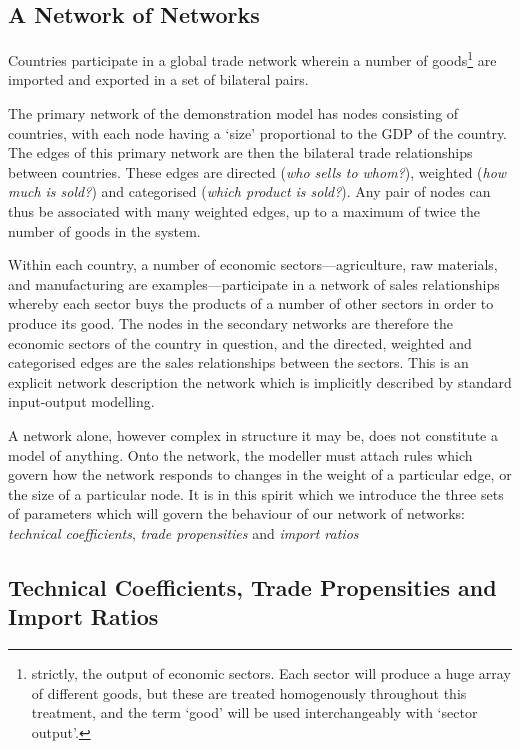 \documentclass[preprint,authoryear,3p]{elsarticle}
\begin{document}
\subsection{A Network of Networks}
Countries participate in a global trade network wherein a number of goods\footnote{strictly, the output of economic sectors. Each sector will produce a huge array of different goods, but these are treated homogenously throughout this treatment, and the term `good' will be used interchangeably with `sector output'.} are imported and exported in a set of bilateral pairs.

The primary network of the demonstration model has nodes consisting of countries, with each node having a `size' proportional to the GDP of the country. The edges of this primary network are then the bilateral trade relationships between countries. These edges are directed (\textit{who sells to whom?}), weighted (\textit{how much is sold?}) and categorised (\textit{which product is sold?}). Any pair of nodes can thus be associated with many weighted edges, up to a maximum of twice the number of goods in the system.

Within each country, a number of economic sectors---agriculture, raw materials, and manufacturing are examples---participate in a network of sales relationships whereby each sector buys the products of a number of other sectors in order to produce its good. The nodes in the secondary networks are therefore the economic sectors of the country in question, and the directed, weighted and categorised edges are the sales relationships between the sectors. This is an explicit network description the network which is implicitly described by standard input-output modelling.

A network alone, however complex in structure it may be, does not constitute a model of anything. Onto the network, the modeller must attach rules which govern how the network responds to changes in the weight of a particular edge, or the size of a particular node. It is in this spirit which we introduce the three sets of parameters which will govern the behaviour of our network of networks: \textit{technical coefficients}, \textit{trade propensities} and \textit{import ratios}





\subsection{Technical Coefficients, Trade Propensities and Import Ratios}
\end{document}
